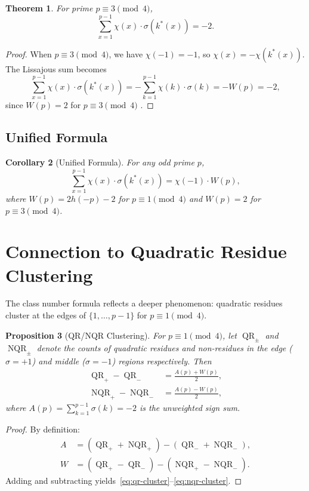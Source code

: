\documentclass[11pt,a4paper]{article}
\newtheorem{theorem}{Theorem}
\newtheorem{corollary}[theorem]{Corollary}
\newtheorem{proposition}[theorem]{Proposition}
\begin{document}
\begin{theorem}\label{thm:mod3}
For prime $p \equiv 3 \pmod 4$,
\[
\sum_{x=1}^{p-1} \chi(x) \cdot \sigma(k^*(x)) = -2.
\]
\end{theorem}

\begin{proof}
When $p \equiv 3 \pmod 4$, we have $\chi(-1) = -1$, so $\chi(x) = -\chi(k^*(x))$. The Lissajous sum becomes
\[
\sum_{x=1}^{p-1} \chi(x) \cdot \sigma(k^*(x)) = -\sum_{k=1}^{p-1} \chi(k) \cdot \sigma(k) = -W(p) = -2,
\]
since $W(p) = 2$ for $p \equiv 3 \pmod 4$ \cite{Popelka2025sign}.
\end{proof}

\subsection{Unified Formula}

\begin{corollary}[Unified Formula]\label{cor:unified}
For any odd prime $p$,
\[
\sum_{x=1}^{p-1} \chi(x) \cdot \sigma(k^*(x)) = \chi(-1) \cdot W(p),
\]
where $W(p) = 2h(-p) - 2$ for $p \equiv 1 \pmod 4$ and $W(p) = 2$ for $p \equiv 3 \pmod 4$.
\end{corollary}

\section{Connection to Quadratic Residue Clustering}

The class number formula reflects a deeper phenomenon: quadratic residues cluster at the edges of $\{1, \ldots, p-1\}$ for $p \equiv 1 \pmod 4$.

\begin{proposition}[QR/NQR Clustering]\label{prop:clustering}
For $p \equiv 1 \pmod 4$, let $\operatorname{QR}_\pm$ and $\operatorname{NQR}_\pm$ denote the counts of quadratic residues and non-residues in the edge ($\sigma = +1$) and middle ($\sigma = -1$) regions respectively. Then
\begin{align}
\operatorname{QR}_+ - \operatorname{QR}_- &= \frac{A(p) + W(p)}{2}, \label{eq:qr-cluster}\\
\operatorname{NQR}_+ - \operatorname{NQR}_- &= \frac{A(p) - W(p)}{2}, \label{eq:nqr-cluster}
\end{align}
where $A(p) = \sum_{k=1}^{p-1} \sigma(k) = -2$ is the unweighted sign sum.
\end{proposition}

\begin{proof}
By definition:
\begin{align*}
A &= (\operatorname{QR}_+ + \operatorname{NQR}_+) - (\operatorname{QR}_- + \operatorname{NQR}_-), \\
W &= (\operatorname{QR}_+ - \operatorname{QR}_-) - (\operatorname{NQR}_+ - \operatorname{NQR}_-).
\end{align*}
Adding and subtracting yields~\eqref{eq:qr-cluster}--\eqref{eq:nqr-cluster}.
\end{proof}
\end{document}
